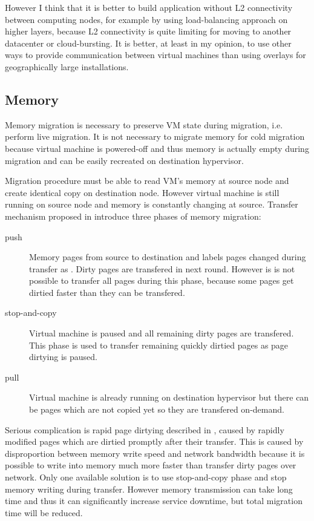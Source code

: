 However I think that it is better to build application without L2 connectivity between computing nodes, for example by using load-balancing approach on higher layers, because L2 connectivity is quite limiting for moving to another datacenter or cloud-bursting. It is better, at least in my opinion, to use other ways to provide communication between virtual machines than using overlays for geographically large installations.

\subsection{Memory}
Memory migration is necessary to preserve \Ac{VM} state during migration, i.e. perform live migration. It is not necessary to migrate memory for cold migration because virtual machine is powered-off and thus memory is actually empty during migration and can be easily recreated on destination hypervisor. 

Migration procedure must be able to read \Ac{VM}'s memory at source node and create identical copy on destination node. However virtual machine is still running on source node and memory is constantly changing at source. Transfer mechanism proposed in \cite{live-migration-of-vms} introduce three phases of memory migration:
\begin{description}
	\item[push] Memory pages from source to destination and labels pages changed during transfer as . Dirty pages are transfered in next round. However is is not possible to transfer all pages during this phase, because some pages get dirtied faster than they can be transfered.
	\item[stop-and-copy] Virtual machine is paused and all remaining dirty pages are transfered. This phase is used to transfer remaining quickly dirtied pages as page dirtying is paused.
	\item[pull] Virtual machine is already running on destination hypervisor but there can be pages which are not copied yet so they are transfered on-demand.
\end{description}

Serious complication is rapid page dirtying described in \cite{live-migration-of-vms}, caused by rapidly modified pages which are dirtied promptly after their transfer. This is caused by disproportion between memory write speed and network bandwidth because it is possible to write into memory much more faster than transfer dirty pages over network. Only one available solution is to use stop-and-copy phase and stop memory writing during transfer. However memory transmission can take long time and thus it can significantly increase service downtime, but total migration time will be reduced.

